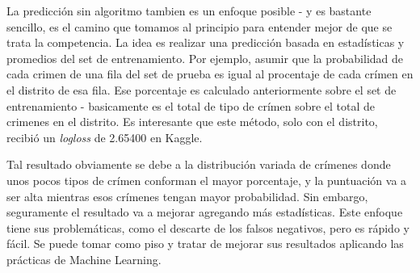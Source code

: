 La predicción sin algoritmo tambien es un enfoque posible - y es bastante sencillo, es el camino que tomamos al principio para entender mejor de que se trata la competencia. La idea es realizar una predicción basada en estadísticas y promedios del set de entrenamiento. Por ejemplo, asumir que la probabilidad de cada crimen de una fila del set de prueba es igual al procentaje de cada crímen en el distrito de esa fila. Ese porcentaje es calculado anteriormente sobre el set de entrenamiento - basicamente es el total de tipo de crímen sobre el total de crimenes en el distrito. Es interesante que este método, solo con el distrito, recibió un \textit{logloss} de 2.65400 en Kaggle.

Tal resultado obviamente se debe a la distribución variada de crímenes donde unos pocos tipos de crímen conforman el mayor porcentaje, y la puntuación va a ser alta mientras esos crímenes tengan mayor probabilidad. Sin embargo, seguramente el resultado va a mejorar agregando más estadísticas. Este enfoque tiene sus problemáticas, como el descarte de los falsos negativos, pero es rápido y fácil. Se puede tomar como piso y tratar de mejorar sus resultados aplicando las prácticas de Machine Learning.



